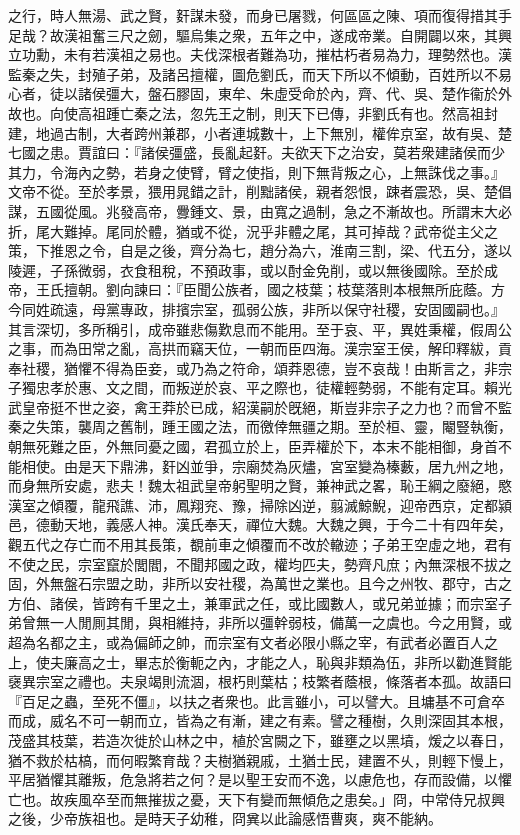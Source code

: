 \begin{pinyinscope}
之行，時人無湯、武之賢，姧謀未發，而身已屠戮，何區區之陳、項而復得措其手足哉？故漢祖奮三尺之劒，驅烏集之衆，五年之中，遂成帝業。自開闢以來，其興立功勳，未有若漢祖之易也。夫伐深根者難為功，摧枯朽者易為力，理勢然也。漢監秦之失，封殖子弟，及諸呂擅權，圖危劉氏，而天下所以不傾動，百姓所以不易心者，徒以諸侯彊大，盤石膠固，東牟、朱虛受命於內，齊、代、吳、楚作衞於外故也。向使高祖踵亡秦之法，忽先王之制，則天下已傳，非劉氏有也。然高祖封建，地過古制，大者跨州兼郡，小者連城數十，上下無別，權侔京室，故有吳、楚七國之患。賈誼曰：『諸侯彊盛，長亂起姧。夫欲天下之治安，莫若衆建諸侯而少其力，令海內之勢，若身之使臂，臂之使指，則下無背叛之心，上無誅伐之事。』文帝不從。至於孝景，猥用晁錯之計，削黜諸侯，親者怨恨，踈者震恐，吳、楚倡謀，五國從風。兆發高帝，釁鍾文、景，由寬之過制，急之不漸故也。所謂末大必折，尾大難掉。尾同於體，猶或不從，況乎非體之尾，其可掉哉？武帝從主父之策，下推恩之令，自是之後，齊分為七，趙分為六，淮南三割，梁、代五分，遂以陵遲，子孫微弱，衣食租稅，不預政事，或以酎金免削，或以無後國除。至於成帝，王氏擅朝。劉向諫曰：『臣聞公族者，國之枝葉；枝葉落則本根無所庇蔭。方今同姓疏遠，母黨專政，排擯宗室，孤弱公族，非所以保守社稷，安固國嗣也。』其言深切，多所稱引，成帝雖悲傷歎息而不能用。至于哀、平，異姓秉權，假周公之事，而為田常之亂，高拱而竊天位，一朝而臣四海。漢宗室王侯，解印釋紱，貢奉社稷，猶懼不得為臣妾，或乃為之符命，頌莽恩德，豈不哀哉！由斯言之，非宗子獨忠孝於惠、文之間，而叛逆於哀、平之際也，徒權輕勢弱，不能有定耳。賴光武皇帝挺不世之姿，禽王莽於已成，紹漢嗣於旣絕，斯豈非宗子之力也？而曾不監秦之失策，襲周之舊制，踵王國之法，而徼倖無疆之期。至於桓、靈，閹豎執衡，朝無死難之臣，外無同憂之國，君孤立於上，臣弄權於下，本末不能相御，身首不能相使。由是天下鼎沸，姧凶並爭，宗廟焚為灰燼，宮室變為榛藪，居九州之地，而身無所安處，悲夫！魏太祖武皇帝躬聖明之賢，兼神武之畧，恥王綱之廢絕，愍漢室之傾覆，龍飛譙、沛，鳳翔兖、豫，掃除凶逆，翦滅鯨鯢，迎帝西京，定都潁邑，德動天地，義感人神。漢氏奉天，禪位大魏。大魏之興，于今二十有四年矣，觀五代之存亡而不用其長策，覩前車之傾覆而不改於轍迹；子弟王空虛之地，君有不使之民，宗室竄於閭閻，不聞邦國之政，權均匹夫，勢齊凡庶；內無深根不拔之固，外無盤石宗盟之助，非所以安社稷，為萬世之業也。且今之州牧、郡守，古之方伯、諸侯，皆跨有千里之土，兼軍武之任，或比國數人，或兄弟並據；而宗室子弟曾無一人閒厠其閒，與相維持，非所以彊幹弱枝，備萬一之虞也。今之用賢，或超為名都之主，或為偏師之帥，而宗室有文者必限小縣之宰，有武者必置百人之上，使夫廉高之士，畢志於衡軛之內，才能之人，恥與非類為伍，非所以勸進賢能襃異宗室之禮也。夫泉竭則流涸，根朽則葉枯；枝繁者蔭根，條落者本孤。故語曰『百足之蟲，至死不僵』，以扶之者衆也。此言雖小，可以譬大。且墉基不可倉卒而成，威名不可一朝而立，皆為之有漸，建之有素。譬之種樹，久則深固其本根，茂盛其枝葉，若造次徙於山林之中，植於宮闕之下，雖壅之以黑墳，煖之以春日，猶不救於枯槁，而何暇繁育哉？夫樹猶親戚，土猶士民，建置不乆，則輕下慢上，平居猶懼其離叛，危急將若之何？是以聖王安而不逸，以慮危也，存而設備，以懼亡也。故疾風卒至而無摧拔之憂，天下有變而無傾危之患矣。」冏，中常侍兄叔興之後，少帝族祖也。是時天子幼稚，冏兾以此論感悟曹爽，爽不能納。


\end{pinyinscope}
